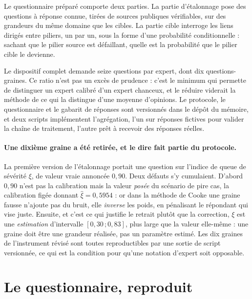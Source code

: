 Le questionnaire préparé comporte deux parties. La partie d'étalonnage pose des
questions à réponse connue, tirées de sources publiques vérifiables, sur des grandeurs du même
domaine que les cibles. La partie cible interroge les liens dirigés entre piliers, un
par un, sous la forme d'une probabilité conditionnelle : sachant que le pilier source est
défaillant, quelle est la probabilité que le pilier cible le devienne.

Le dispositif complet demande seize questions par expert, dont dix questions-graines. Ce ratio
n'est pas un excès de prudence : c'est le minimum qui permette de distinguer un expert calibré
d'un expert chanceux, et le réduire viderait la méthode de ce qui la distingue d'une moyenne
d'opinions. Le protocole, le questionnaire et le gabarit de réponses sont versionnés dans le
dépôt du mémoire, et deux scripts implémentent l'agrégation, l'un sur réponses fictives pour
valider la chaîne de traitement, l'autre prêt à recevoir des réponses réelles.

\paragraph{Une dixième graine a été retirée, et le dire fait partie du protocole.} La première
version de l'étalonnage portait une question sur l'indice de queue de sévérité $\xi$, de valeur
vraie annoncée $0{,}90$. Deux défauts s'y cumulaient. D'abord $0{,}90$ n'est pas la calibration
mais la valeur \emph{posée} du scénario de pire cas, la calibration figée donnant
$\hat\xi = 0{,}5954$ : or dans la méthode de Cooke une graine fausse n'ajoute pas du bruit, elle
\emph{inverse} les poids, en pénalisant le répondant qui vise juste. Ensuite, et c'est ce qui
justifie le retrait plutôt que la correction, $\xi$ est une \emph{estimation} d'intervalle
$[0{,}30\,;0{,}83]$, plus large que la valeur elle-même : une graine doit être une grandeur
réalisée, pas un paramètre estimé. Les dix graines de l'instrument révisé sont toutes reproductibles par une
sortie de script versionnée, ce qui est la condition pour qu'une notation d'expert soit
opposable.

\vspace{2pt}

\section{Le questionnaire, reproduit}
\label{sec:questionnaire-reproduit}

